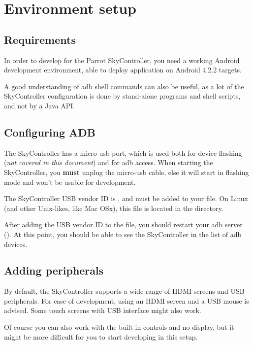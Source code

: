 \section{Environment setup}

\subsection{Requirements}

In order to develop for the Parrot SkyController, you need a working Android development environment, able to deploy application on Android 4.2.2 targets.

A good understanding of adb shell commands can also be useful, as a lot of the SkyController configuration is done by stand-alone programs and shell scripts, and not by a Java API.

\subsection{Configuring ADB}

The SkyController has a micro-usb port, which is used both for device flashing (\textit{not covered in this document}) and for adb access. When starting the SkyController, you \textbf{must} unplug the micro-usb cable, else it will start in flashing mode and won't be usable for development.

The SkyController USB vendor ID is , and must be added to your  file. On Linux (and other Unix-likes, like Mac OSx), this file is located in the  directory.

After adding the USB vendor ID to the  file, you should restart your adb server (). At this point, you should be able to see the SkyController in the list of adb devices.

\subsection{Adding peripherals}

By default, the SkyController supports a wide range of HDMI screens and USB peripherals. For ease of development, using an HDMI screen and a USB mouse is advised. Some touch screens with USB interface might also work.

Of course you can also work with the built-in controls and no display, but it might be more difficult for you to start developing in this setup.

